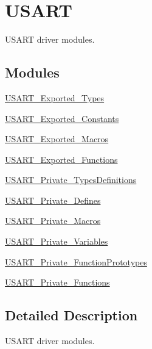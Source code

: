 \hypertarget{group___u_s_a_r_t}{}\section{U\+S\+A\+RT}
\label{group___u_s_a_r_t}


U\+S\+A\+RT driver modules.  


\subsection*{Modules}
\begin{DoxyCompactItemize}
\item 
\hyperlink{group___u_s_a_r_t___exported___types}{U\+S\+A\+R\+T\+\_\+\+Exported\+\_\+\+Types}
\item 
\hyperlink{group___u_s_a_r_t___exported___constants}{U\+S\+A\+R\+T\+\_\+\+Exported\+\_\+\+Constants}
\item 
\hyperlink{group___u_s_a_r_t___exported___macros}{U\+S\+A\+R\+T\+\_\+\+Exported\+\_\+\+Macros}
\item 
\hyperlink{group___u_s_a_r_t___exported___functions}{U\+S\+A\+R\+T\+\_\+\+Exported\+\_\+\+Functions}
\item 
\hyperlink{group___u_s_a_r_t___private___types_definitions}{U\+S\+A\+R\+T\+\_\+\+Private\+\_\+\+Types\+Definitions}
\item 
\hyperlink{group___u_s_a_r_t___private___defines}{U\+S\+A\+R\+T\+\_\+\+Private\+\_\+\+Defines}
\item 
\hyperlink{group___u_s_a_r_t___private___macros}{U\+S\+A\+R\+T\+\_\+\+Private\+\_\+\+Macros}
\item 
\hyperlink{group___u_s_a_r_t___private___variables}{U\+S\+A\+R\+T\+\_\+\+Private\+\_\+\+Variables}
\item 
\hyperlink{group___u_s_a_r_t___private___function_prototypes}{U\+S\+A\+R\+T\+\_\+\+Private\+\_\+\+Function\+Prototypes}
\item 
\hyperlink{group___u_s_a_r_t___private___functions}{U\+S\+A\+R\+T\+\_\+\+Private\+\_\+\+Functions}
\end{DoxyCompactItemize}


\subsection{Detailed Description}
U\+S\+A\+RT driver modules. 

